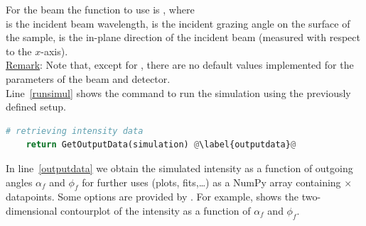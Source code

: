 \noindent For the beam the function to use is
, where\\
 is the incident beam wavelength,
 is the incident
grazing angle on the surface of the sample,
 is the in-plane
direction of the incident beam (measured with respect to the
$x$-axis).\\ 

\noindent \underline{Remark}: Note that, except for
, there are no default values implemented for the
parameters of the beam and detector.\\

\noindent Line~\ref{runsimul} shows the command to run the simulation using the
previously defined setup.


\begin{lstlisting}[language=python, style=eclipseboxed,name=ex1,nolol]
    # retrieving intensity data
    return GetOutputData(simulation) @\label{outputdata}@
\end{lstlisting}


\noindent In line~\ref{outputdata} we obtain the simulated intensity
as a function of outgoing angles $\alpha_f$ and $\phi_f$ for further
uses (plots, fits,\ldots) as a NumPy array containing
$\times$
datapoints. Some options are provided by \BornAgain. For example,  shows the two-dimensional
contourplot of the intensity as a function of $\alpha_f$ and
$\phi_f$. 

